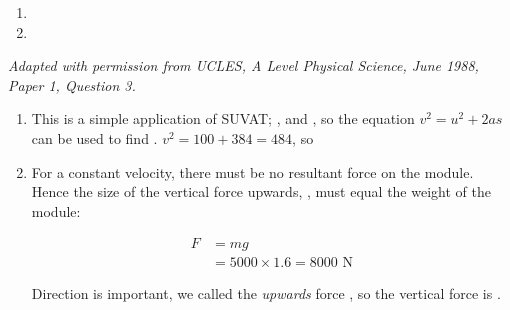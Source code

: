 
\begin{problem}[A1988PSIQ3l]
{
\begin{enumerate} 
  	\item {}
  	\item {}
  	\end{enumerate}
}
{\textit{Adapted with permission from UCLES, A Level Physical Science, June 1988, Paper 1, Question 3.}}
{\begin{enumerate}

	\item This is a simple application of SUVAT; ,  and , so the equation $v^{2} = u^{2} + 2as$ can be used to find . $v^{2} = 100 + 384 = 484$, so 
	\item For a constant velocity, there must be no resultant force on the module. Hence the size of the vertical force upwards, , must equal the weight of the module:
	
\begin{align*} F &=mg \\
& = 5000 \times 1.6 = 8000 \textrm{ N} \end{align*}

Direction is important, we called the \textit{upwards} force , so the vertical force is .
\end{enumerate}
}
\end{problem}